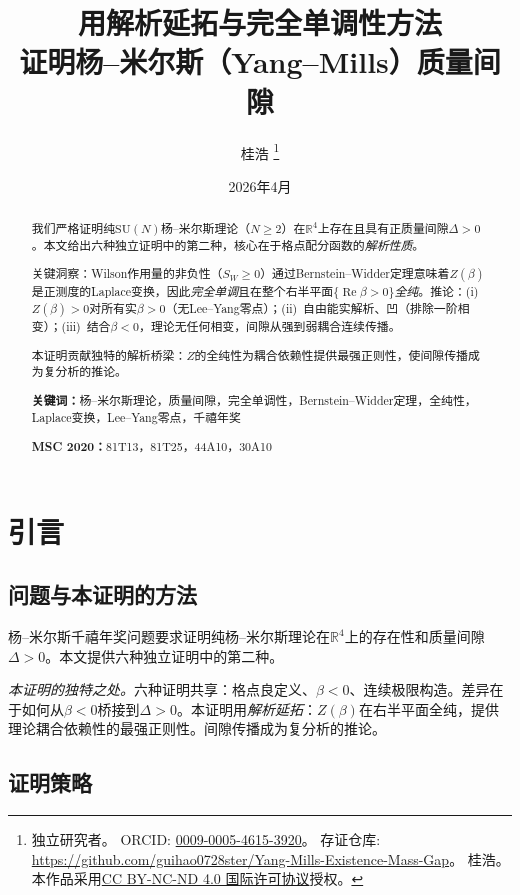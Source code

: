 \documentclass[12pt,a4paper]{article}
\title{\textbf{用解析延拓与完全单调性方法\\[4pt]证明杨--米尔斯（Yang--Mills）质量间隙}}
\author{%
  桂浩%
  \thanks{%
    独立研究者。\quad
    ORCID: \href{https://orcid.org/0009-0005-4615-3920}{0009-0005-4615-3920}。\newline
    存证仓库: \url{https://github.com/guihao0728ster/Yang-Mills-Existence-Mass-Gap}。\newline
    \textcopyright\;2026\;桂浩。
    本作品采用\href{https://creativecommons.org/licenses/by-nc-nd/4.0/}{CC BY-NC-ND 4.0 国际许可协议}授权。%
  }%
}
\date{2026年4月}
\theoremstyle{plain}
\theoremstyle{definition}
\theoremstyle{remark}
\begin{document}
\maketitle

\begin{abstract}
我们严格证明纯$\mathrm{SU}(N)$杨--米尔斯理论（$N\geq 2$）在$\mathbb{R}^4$上存在且具有正质量间隙$\Delta>0$。本文给出六种独立证明中的第二种，核心在于格点配分函数的\emph{解析性质}。

关键洞察：Wilson作用量的非负性（$S_W\geq 0$）通过Bernstein--Widder定理意味着$Z(\beta)$是正测度的Laplace变换，因此\emph{完全单调}且在整个右半平面$\{\operatorname{Re}\beta>0\}$\emph{全纯}。推论：(i)~$Z(\beta)>0$对所有实$\beta>0$（无Lee--Yang零点）；(ii)~自由能实解析、凹（排除一阶相变）；(iii)~结合$\beta<0$，理论无任何相变，间隙从强到弱耦合连续传播。

本证明贡献独特的解析桥梁：$Z$的全纯性为耦合依赖性提供最强正则性，使间隙传播成为复分析的推论。

\medskip\noindent\textbf{关键词：}杨--米尔斯理论，质量间隙，完全单调性，Bernstein--Widder定理，全纯性，Laplace变换，Lee--Yang零点，千禧年奖

\medskip\noindent\textbf{MSC 2020：}81T13，81T25，44A10，30A10
\end{abstract}

\tableofcontents

\section{引言}\label{sec:intro}

\subsection{问题与本证明的方法}\label{sec:approach}

杨--米尔斯千禧年奖问题\cite{JaffeWitten2000}要求证明纯杨--米尔斯理论在$\mathbb{R}^4$上的存在性和质量间隙$\Delta>0$。本文提供六种独立证明中的第二种。

\textit{本证明的独特之处。}六种证明共享：格点良定义、$\beta<0$、连续极限构造。差异在于如何从$\beta<0$桥接到$\Delta>0$。本证明用\emph{解析延拓}：$Z(\beta)$在右半平面全纯，提供理论耦合依赖性的最强正则性。间隙传播成为复分析的推论。

\subsection{证明策略}\label{sec:strategy}
\end{document}
